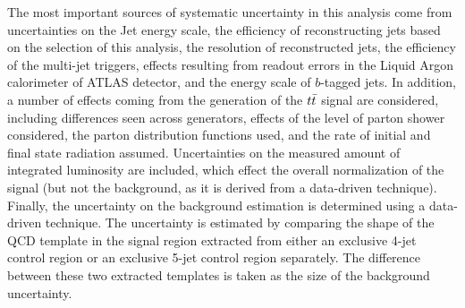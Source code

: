 The most important sources of systematic uncertainty in this analysis come from uncertainties on the Jet energy scale,
the efficiency of reconstructing jets based on the selection of this analysis, the resolution of reconstructed jets,
the efficiency of the multi-jet triggers, 
effects resulting from readout errors in the Liquid Argon calorimeter of ATLAS detector, 
and the energy scale of $b$-tagged jets.
In addition, a number of effects coming from the generation of the $t\bar{t}$ signal are considered, 
including differences seen across generators, effects of the level of parton shower considered, 
the parton distribution functions used,
and the rate of initial and final state radiation assumed.
Uncertainties on the measured amount of integrated luminosity are included, which effect the overall
normalization of the signal (but not the background, as it is derived from a data-driven technique).
Finally, the uncertainty on the background estimation is determined using a data-driven technique.
The uncertainty is estimated by comparing the shape of the QCD template in the signal region extracted
from either an exclusive 4-jet control region or an exclusive 5-jet control region separately.
The difference between these two extracted templates is taken as the size of the background uncertainty.
